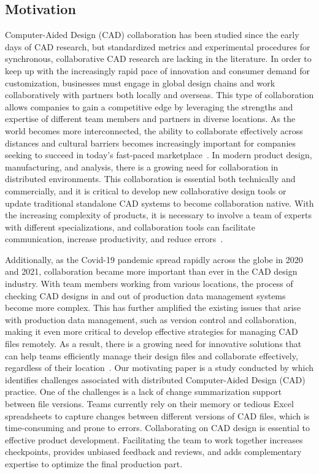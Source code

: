 \documentclass[sigconf,authorversion,nonacm]{acmart}
\begin{document}
\subsection{Motivation}

Computer-Aided Design (CAD) collaboration has been studied since the early days of CAD research, but standardized metrics and experimental procedures for synchronous, collaborative CAD research are lacking in the literature.
In order to keep up with the increasingly rapid pace of innovation and consumer demand for customization, businesses must engage in global design chains and work collaboratively with partners both locally and overseas.
This type of collaboration allows companies to gain a competitive edge by leveraging the strengths and expertise of different team members and partners in diverse locations.
As the world becomes more interconnected, the ability to collaborate effectively across distances and cultural barriers becomes increasingly important for companies seeking to succeed in today's fast-paced marketplace~\cite{fuh2005advances}.
In modern product design, manufacturing, and analysis, there is a growing need for collaboration in distributed environments.
This collaboration is essential both technically and commercially, and it is critical to develop new collaborative design tools or update traditional standalone CAD systems to become collaboration native.
With the increasing complexity of products, it is necessary to involve a team of experts with different specializations, and collaboration tools can facilitate communication, increase productivity, and reduce errors~\cite{fuh2005advances}.

Additionally, as the Covid-19 pandemic spread rapidly across the globe in 2020 and 2021, collaboration became more important than ever in the CAD design industry.
With team members working from various locations, the process of checking CAD designs in and out of production data management systems become more complex.
This has further amplified the existing issues that arise with production data management, such as version control and collaboration, making it even more critical to develop effective strategies for managing CAD files remotely.
As a result, there is a growing need for innovative solutions that can help teams efficiently manage their design files and collaborate effectively, regardless of their location~\cite{armstrong}.
Our motivating paper is a study conducted by \citet{cheng2023age} which identifies challenges associated with distributed Computer-Aided Design (CAD) practice.
One of the challenges is a lack of change summarization support between file versions.
Teams currently rely on their memory or tedious Excel spreadsheets to capture changes between different versions of CAD files, which is time-consuming and prone to errors.
Collaborating on CAD design is essential to effective product development.
Facilitating the team to work together increases checkpoints, provides unbiased feedback and reviews, and adds complementary expertise to optimize the final production part.
\end{document}
